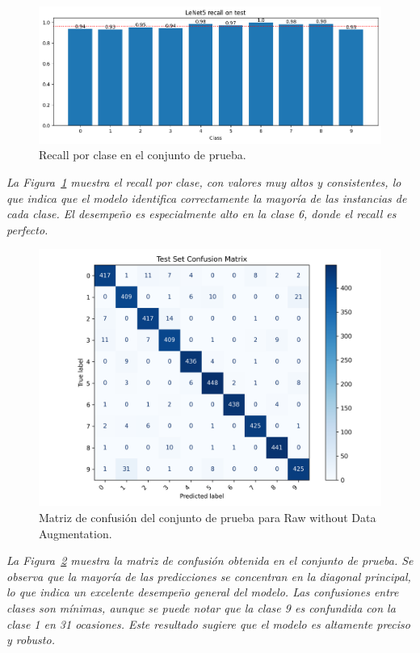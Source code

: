\documentclass[conference]{IEEEtran}
\begin{document}
\begin{figure}[H]
    \centering
    \includegraphics[width=0.95\linewidth]{graphics-raw/raw-recall-test.png}
    \caption{Recall por clase en el conjunto de prueba.}
    \label{fig:raw-recall-test}
\end{figure}
\noindent\textit{
La Figura~\ref{fig:raw-recall-test} muestra el recall por clase, con valores muy altos y consistentes, lo que indica que el modelo identifica correctamente la mayoría de las instancias de cada clase. El desempeño es especialmente alto en la clase 6, donde el recall es perfecto.
}


\begin{figure}[H]
    \centering
    \includegraphics[width=0.95\linewidth]{graphics-raw/raw-confusion-matrix.png}
    \caption{Matriz de confusión del conjunto de prueba para Raw without Data Augmentation.}
    \label{fig:raw-confusion-matrix}
\end{figure}
\noindent\textit{
La Figura~\ref{fig:raw-confusion-matrix} muestra la matriz de confusión obtenida en el conjunto de prueba. Se observa que la mayoría de las predicciones se concentran en la diagonal principal, lo que indica un excelente desempeño general del modelo. Las confusiones entre clases son mínimas, aunque se puede notar que la clase 9 es confundida con la clase 1 en 31 ocasiones. Este resultado sugiere que el modelo es altamente preciso y robusto.
}
\end{document}

